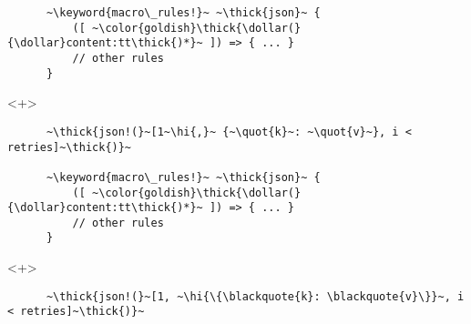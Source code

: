\documentclass[usepdftitle=false,aspectratio=169]{beamer}
\newcommand{\dollar}{\makebox[\widthof{\$}][c]{\$}}
\newcommand{\thick}[1]{\contourlength{0.16pt}\contour[10]{black}{#1}}
\newcommand{\slantbox}[2][.5]
  {%
    \mbox
      {%
        \sbox{\foobox}{#2}%
        \hskip\wd\foobox
        \pdfsave
        \pdfsetmatrix{1 0 #1 1}%
        \llap{\usebox{\foobox}}%
        \pdfrestore
      }%
  }
\newcommand{\backslantbox}[2][.5]
  {%
    \mbox
      {%
        \sbox{\foobox}{#2}%
        \hskip\wd\foobox
        \pdfsave
        \pdfsetmatrix{-1 0 #1 1}%
        \llap{\usebox{\foobox}}%
        \pdfrestore
      }%
  }
\newcommand{\hi}[1]{%
\tikz[baseline=(A.base)]
 \node[highlighting=yellowbg,inner sep=0pt,text depth=0pt] (A) {#1};%
}
\newcommand{\openquote}{\backslantbox[.2]{\hspace{11pt}''\hspace{-11pt}}}
\newcommand{\closequote}{\slantbox[-.2]{\hspace{2pt}''\hspace{-2pt}}}
\newcommand{\blackquote}[1]{\openquote#1\closequote}
\newcommand{\quot}[1]{{\color{redish}\blackquote{#1}}}
\newcommand{\keyword}[1]{\color{greenish}#1}
\begin{document}
\begin{frame}[fragile]
\begin{onlyenv}
\begin{verbatim}
      ~\keyword{macro\_rules!}~ ~\thick{json}~ {
          ([ ~\color{goldish}\thick{\dollar(}{\dollar}content:tt\thick{)*}~ ]) => { ... }
          // other rules
      }
    \end{verbatim}
  \end{onlyenv}
  \begin{onlyenv}<+>
    \vspace{-20.5pt}
    \begin{verbatim}
      ~\thick{json!(}~[1~\hi{,}~ {~\quot{k}~: ~\quot{v}~}, i < retries]~\thick{)}~

      ~\keyword{macro\_rules!}~ ~\thick{json}~ {
          ([ ~\color{goldish}\thick{\dollar(}{\dollar}content:tt\thick{)*}~ ]) => { ... }
          // other rules
      }
    \end{verbatim}
  \end{onlyenv}
  \begin{onlyenv}<+>
    \vspace{-20.5pt}
    \begin{verbatim}
      ~\thick{json!(}~[1, ~\hi{\{\blackquote{k}: \blackquote{v}\}}~, i < retries]~\thick{)}~


\end{verbatim}
\end{onlyenv}
\end{frame}
\end{document}
